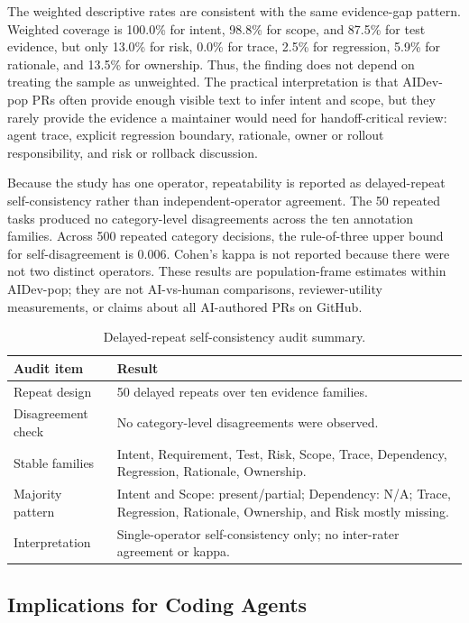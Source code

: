 \documentclass[10pt,conference]{IEEEtran}
\begin{document}
The weighted descriptive rates are consistent with the same evidence-gap pattern.
Weighted coverage is 100.0\% for intent, 98.8\% for scope, and 87.5\% for test evidence, but only 13.0\% for risk, 0.0\% for trace, 2.5\% for regression, 5.9\% for rationale, and 13.5\% for ownership.
Thus, the finding does not depend on treating the sample as unweighted.
The practical interpretation is that AIDev-pop PRs often provide enough visible text to infer intent and scope, but they rarely provide the evidence a maintainer would need for handoff-critical review: agent trace, explicit regression boundary, rationale, owner or rollout responsibility, and risk or rollback discussion.

Because the study has one operator, repeatability is reported as delayed-repeat self-consistency rather than independent-operator agreement.
The 50 repeated tasks produced no category-level disagreements across the ten annotation families.
Across 500 repeated category decisions, the rule-of-three upper bound for self-disagreement is 0.006.
Cohen's kappa is not reported because there were not two distinct operators.
These results are population-frame estimates within AIDev-pop; they are not AI-vs-human comparisons, reviewer-utility measurements, or claims about all AI-authored PRs on GitHub.

\begin{table}[t]
\centering
\caption{Delayed-repeat self-consistency audit summary.}
\label{tab:annotation-agreement}
\footnotesize
\begin{tabular}{@{}L{0.34\columnwidth}L{0.60\columnwidth}@{}}
\toprule
Audit item & Result \\
\midrule
Repeat design & 50 delayed repeats over ten evidence families. \\
Disagreement check & No category-level disagreements were observed. \\
Stable families & Intent, Requirement, Test, Risk, Scope, Trace, Dependency, Regression, Rationale, Ownership. \\
Majority pattern & Intent and Scope: present/partial; Dependency: N/A; Trace, Regression, Rationale, Ownership, and Risk mostly missing. \\
Interpretation & Single-operator self-consistency only; no inter-rater agreement or kappa. \\
\bottomrule
\end{tabular}
\end{table}

\subsection{Implications for Coding Agents}
\end{document}
